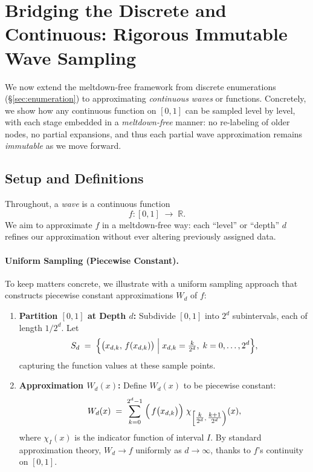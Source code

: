 \section{Bridging the Discrete and Continuous: Rigorous Immutable Wave Sampling}
\label{sec:immutable-wave-sampling}

We now extend the meltdown-free framework from discrete enumerations
(\S\ref{sec:enumeration}) to approximating \emph{continuous waves} or functions.
Concretely, we show how any continuous function on $[0,1]$ can be sampled
level by level, with each stage embedded in a \emph{meltdown-free} manner:
no re-labeling of older nodes, no partial expansions, and thus each partial
wave approximation remains \emph{immutable} as we move forward.

\subsection{Setup and Definitions}
\label{subsec:wave-setup}

\begin{definition}
  \label{def:wave}
  Throughout, a \emph{wave} is a continuous function
  \[
    f : [0,1] \;\to\; \mathbb{R}.
  \]
  We aim to approximate $f$ in a meltdown-free way: each ``level'' or ``depth''
  $d$ refines our approximation without ever altering previously assigned data.
\end{definition}

\paragraph{Uniform Sampling (Piecewise Constant).}
To keep matters concrete, we illustrate with a uniform sampling approach
that constructs piecewise constant approximations $W_d$ of $f$:
\begin{enumerate}
  \item \textbf{Partition $[0,1]$ at Depth $d$:}  
    Subdivide $[0,1]$ into $2^d$ subintervals, each of length $1/2^d$. Let
    \[
      S_d \;=\; \Bigl\{\bigl(x_{d,k},\,f(x_{d,k})\bigr)\;\Big|\;
        x_{d,k} = \tfrac{k}{2^d},\; k=0,\dots,2^d
      \Bigr\},
    \]
    capturing the function values at these sample points.
  \item \textbf{Approximation $W_d(x)$:}  
    Define $W_d(x)$ to be piecewise constant:
    \[
      W_d(x) \;=\; \sum_{k=0}^{2^d-1} \;
      \Bigl(\,
        f\bigl(x_{d,k}\bigr)
      \Bigr)\;
      \chi_{\left[\tfrac{k}{2^d},\,\tfrac{k+1}{2^d}\right)}(x),
    \]
    where $\chi_I(x)$ is the indicator function of interval $I$. By standard
    approximation theory, $W_d \to f$ uniformly as $d\to\infty$, thanks to $f$'s
    continuity on $[0,1]$.
\end{enumerate}

